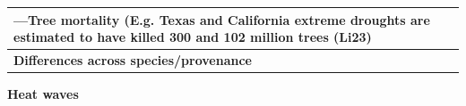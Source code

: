 \documentclass{article}
\begin{document}
\begin{enumerate}
{\begin{tabular}{|>{\raggedright\arraybackslash}p{4cm}|p{12cm}|}
—Tree mortality (E.g. Texas and California extreme droughts are estimated to have killed 300 and 102 million trees (Li23)\\
\hline
\textbf{Differences across species/provenance} &  \\
\hline
\end{tabular}
}

\textbf{Heat waves}\\






\end{enumerate}
\end{document}
